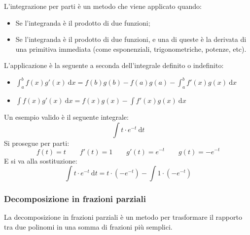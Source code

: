 \documentclass[a4paper]{article}
\begin{document}
	L'integrazione per parti è un metodo che viene applicato quando:
	\begin{itemize}
		\item Se l'integranda è il prodotto di due funzioni;
		\item Se l'integranda è il prodotto di due funzioni, e una di queste è la derivata di una primitiva immediata (come esponenziali, trigonometriche, potenze, etc).
	\end{itemize}
	L'applicazione è la seguente a seconda dell'integrale definito o indefinito:	
	\begin{itemize}
		\item $\displaystyle \int_{a}^{b} f\left(x\right) g'\left(x\right) \: \mathrm{d}x = f\left(b\right)g\left(b\right) - f\left(a\right)g\left(a\right) - \int_{a}^{b} f'\left(x\right)g\left(x\right) \:\mathrm{d}x$

		\item $\displaystyle \int f\left(x\right) g'\left(x\right) \: \mathrm{d}x = f\left(x\right)g\left(x\right) - \int f'\left(x\right)g\left(x\right) \: \mathrm{d}x$
	\end{itemize}
	Un esempio valido è il seguente integrale:
	\begin{equation*}
		\displaystyle \int t \cdot e^{-t} \: \mathrm{d}t
	\end{equation*}
	Si prosegue per parti:
	\begin{equation*}
		f\left(t\right) = t \hspace{2em} f'\left(t\right) = 1 \hspace{2em} g'\left(t\right) = e^{-t} \hspace{2em} g\left(t\right) = - e^{-t}
	\end{equation*}
	E si va alla sostituzione:
	\begin{equation*}
		\displaystyle \int t \cdot e^{-t} \: \mathrm{d}t = t \cdot \left(-e^{-t}\right) - \int 1 \cdot \left(-e^{-t}\right)
	\end{equation*}\newpage

	\subsubsection{Decomposizione in frazioni parziali}\label{subsubsection: decomposizione in frazioni parziali}

	La decomposizione in frazioni parziali è un metodo per trasformare il rapporto tra due polinomi in una somma di frazioni più semplici.\newline
	
\end{document}

